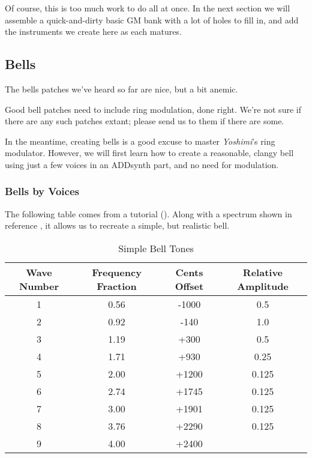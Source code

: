    Of course, this is too much work to do all at once.  In the next section
   we will assemble a quick-and-dirty basic GM bank with a lot of holes to
   fill in, and add the instruments we create here as each matures.

\subsection{Bells}
\label{subsec:cookbook_instruments_bells}

   The bells patches we've heard so far are nice, but a bit anemic.
   
   Good bell patches need to include ring modulation, done right.  We're not
   sure if there are any such patches extant; please send us to them if
   there are some.

   In the meantime, creating bells is a good excuse to master
   \textsl{Yoshimi}'s ring modulator.
   However, we will first learn how to create a reasonable, clangy bell
   using just a few voices in an ADDsynth part, and no need for modulation.

\subsubsection{Bells by Voices}
\label{subsec:cookbook_instruments_bells_by_voices}

   The following table comes from a tutorial (\cite{bellsimple}).  Along
   with a spectrum shown in reference \cite{bellspectrum}, it allows us to
   recreate a simple, but realistic bell.

\label{table:simple_bell_tones}
\begin{longtable}{c c c c}
   \caption{Simple Bell Tones} \\
   \hline
      \textbf{Wave Number} &
      \textbf{Frequency Fraction} &
      \textbf{Cents Offset} &
      \textbf{Relative Amplitude} \\
   \hline
   \endfirsthead

   1 &         0.56 &         -1000 &     0.5   \\
   2 &         0.92 &         -140  &     1.0   \\
   3 &         1.19 &         +300  &     0.5   \\
   4 &         1.71 &         +930  &     0.25  \\
   5 &         2.00 &         +1200 &     0.125 \\
   6 &         2.74 &         +1745 &     0.125 \\
   7 &         3.00 &         +1901 &     0.125 \\
   8 &         3.76 &         +2290 &     0.125 \\
   9 &         4.00 &         +2400 &           \\
\end{longtable}

